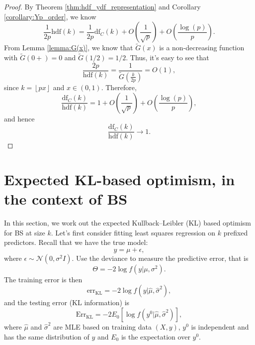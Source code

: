 \dfasycorollary*
\begin{proof}
	By Theorem \ref{thm:hdf_ydf_representation} and Corollary \ref{corollary:Yp_order}, we know
	\begin{equation*}
	\frac{1}{2p} \text{hdf}(k) = \frac{1}{2p}\text{df}_C(k) + O\left(\frac{1}{\sqrt{p}}\right) + O\left(\frac{\log(p)}{p} \right).
	\end{equation*}
	From Lemma \ref{lemma:G(x)}, we know that $\tilde{G}(x)$ is a non-decreasing function with $\tilde{G}(0+)=0$ and $\tilde{G}(1/2)=1/2$. Thus, it's easy to see that
	\begin{equation*}
	\frac{2p}{\text{hdf}(k)} = \frac{1}{\tilde{G}(\frac{k}{2p})} = O(1),
	\end{equation*}
	since $k=\left \lfloor{px}\right \rfloor$ and $x\in(0,1)$. Therefore, 
	\begin{equation*}
	\frac{\text{df}_C(k)}{\text{hdf}(k)} = 1 + O\left(\frac{1}{\sqrt{p}}\right) + O\left(\frac{\log(p)}{p} \right),
	\end{equation*}
	and hence
	\begin{equation*}
	\frac{\text{df}_C(k)}{\text{hdf}(k)} \to 1.
	\end{equation*}
\end{proof}

\section{Expected KL-based optimism, in the context of BS }
\label{sec:expectedkl_bs}
In this section, we work out the expected Kullback–Leibler (KL) based optimism for BS at size $k$. Let's first consider fitting least squares regression on $k$ prefixed predictors. Recall that we have the true model:
\begin{equation*}
y = \mu + \epsilon,
\end{equation*}
where $\epsilon \sim \mathcal{N}(0,\sigma^2 I)$. Use the deviance to measure the predictive error, that is 
\begin{equation*}
\Theta=-2 \log f(y|\mu,\sigma^2).
\end{equation*}
The training error is then 
$$\text{err}_{\text{KL}} = -2 \log f (y|\hat{\mu},\hat{\sigma}^2),$$
and the testing error (KL information) is
$$\text{Err}_{\text{KL}}  = -2 E_0 \left[ \log f(y^0|\hat{\mu},\hat{\sigma}^2)\right],$$
where $\hat{\mu}$ and $\hat{\sigma}^2$ are MLE based on training data $(X,y)$, $y^0$ is independent and has the same distribution of $y$ and $E_0$ is the expectation over $y^0$. 

